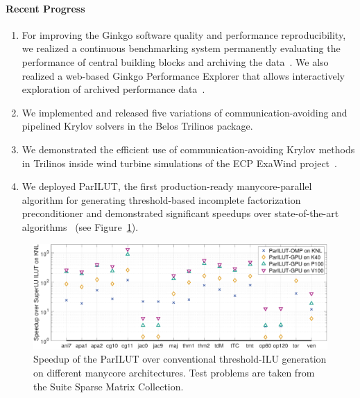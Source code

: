 \paragraph{Recent Progress}
\begin{enumerate}
\item 
For improving the Ginkgo software quality and performance reproducibility, we 
realized a continuous benchmarking system permanently evaluating the 
performance of central building blocks and archiving the data~\cite{pasc_anzt}. 
We 
also realized a web-based Ginkgo Performance Explorer that allows 
interactively exploration of archived performance 
data~\cite{gpewebpage}.
\item
We implemented and released five variations of communication-avoiding
and pipelined Krylov solvers in the Belos Trilinos package.
\item
We demonstrated the efficient use of communication-avoiding Krylov methods in Trilinos
inside wind turbine simulations of the ECP ExaWind project~\cite{Yamazaki-lowsynch}.
\item 
We deployed ParILUT, the first production-ready manycore-parallel algorithm for 
generating threshold-based incomplete factorization preconditioner and 
demonstrated significant speedups over state-of-the-art 
algorithms~\cite{ipdps_anzt} (see Figure~\ref{fig:ParILUTperf}).
\end{enumerate}

\begin{figure}[htb]
	\centering
	\includegraphics[width=5in]{projects/2.3.3-MathLibs/2.3.3.13-CLOVER/parilutspeedup}
	\caption{\label{fig:ParILUTperf}Speedup of the ParILUT over conventional 
	threshold-ILU generation on different manycore architectures. Test problems 
	are taken from the Suite Sparse Matrix Collection.}
\end{figure}


